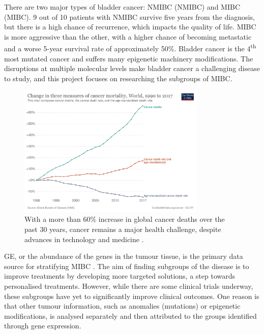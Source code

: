 There are two major types of bladder cancer: \gls{NMIBC} (NMIBC) and \gls{MIBC} (MIBC). 9 out of 10 patients with NMIBC survive five years from the diagnosis, but there is a high chance of recurrence, which impacts the quality of life. MIBC is more aggressive than the other, with a higher chance of becoming metastatic and a worse 5-year survival rate of approximately 50\%. Bladder cancer is the 4\textsuperscript{th} most mutated cancer and suffers many epigenetic machinery modifications. The disruptions at multiple molecular levels make bladder cancer a challenging disease to study, and this project focuses on researching the subgroups of \acrlong{MIBC}.



\begin{figure}[!t]
    \centering
    \includegraphics[width=0.8\textwidth,keepaspectratio]{Images/cancer-deaths-rate-and-age-standardized-rate-index.png}
    \caption[Cancer mortality]{With a more than 60\% increase in global cancer deaths over the past 30 years, cancer remains a major health challenge, despite advances in technology and medicine \citep{Roser2015-qb}.}
    \label{fig:cancer_death}
\end{figure}

\gls{GE}, or the abundance of the genes in the tumour tissue, is the primary data source for stratifying MIBC \citep{Kamoun2020-tj,Robertson2017-mg,Marzouka2018-ge}. The aim of finding subgroups of the disease is to improve treatments by developing more targeted solutions, a step towards personalised treatments. However, while there are some clinical trials \citep{Griffin2024-zr} underway, these subgroups have yet to significantly improve clinical outcomes. One reason is that other tumour information, such as anomalies (mutations) or epigenetic modifications, is analysed separately and then attributed to the groups identified through gene expression.

